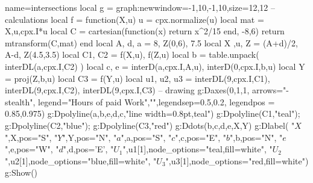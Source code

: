 \documentclass{standalone}
\begin{document}
    \begin{luadraw}{name=intersections}
    local g = graph:new{window={-1,10,-1,10},size={12,12}}
    -- calculations
    local f = function(X,u)
        u = cpx.normalize(u)
        local mat = {X,u,cpx.I*u}
        local C = cartesian(function(x) return x^2/15 end, -8,6)
        return mtransform(C,mat)
    end
    local A, d, a = 8, Z(0,6), 7.5
    local X ,u, Z = (A+d)/2, A-d, Z(4.5,3.5)
    local C1, C2 = f(X,u), f(Z,u)
    local b = table.unpack( interDL({a,cpx.I},C2) )
    local c, e = interD({a,cpx.I},{A,u}), interD({0,cpx.I},{b,u})
    local Y = proj(Z,{b,u})
    local C3 = f(Y,u)
    local u1, u2, u3 = interDL({9,cpx.I},C1), interDL({9,cpx.I},C2), interDL({9,cpx.I},C3)
    -- drawing
    g:Daxes({0,1,1}, {arrows="-stealth", legend={"Hours of paid Work",""},legendsep={0.5,0.2}, legendpos = {0.85,0.975}})
    g:Dpolyline({a,b,e,d,c},"line width=0.8pt,teal")
    g:Dpolyline(C1,"teal"); g:Dpolyline(C2,"blue"); g:Dpolyline(C3,"red")
    g:Ddots({b,c,d,e,X,Y})
    g:Dlabel( "$X$",X,{pos="S"}, "$Y$",Y,{pos="N"}, "$a$",a,{pos="S"}, "$c$",c,{pos="E"}, "$b$",b,{pos="N"}, "$e$",e,{pos="W"}, "$d$",d,{pos='E'}, "$U_1$",u1[1],{node_options="teal,fill=white"}, "$U_2$",u2[1],{node_options="blue,fill=white"}, "$U_3$",u3[1],{node_options="red,fill=white"})
    g:Show()
    \end{luadraw}
\end{document}
